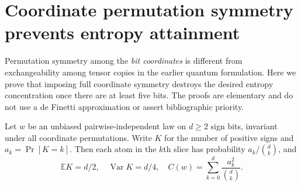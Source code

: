 \section{Coordinate permutation symmetry prevents entropy attainment}
\label{sec:coordinate-symmetry}
Permutation symmetry among the \emph{bit coordinates} is different
from exchangeability among tensor copies in the earlier quantum
formulation. Here we prove that imposing full coordinate symmetry
destroys the desired entropy concentration once there are at least
five bits. The proofs are elementary and do not use a de Finetti
approximation or assert bibliographic priority.

Let $w$ be an unbiased pairwise-independent law on $d\ge2$ sign bits,
invariant under all coordinate permutations. Write $K$ for the number
of positive signs and $a_k=\Pr[K=k]$. Then each atom in the $k$th
slice has probability $a_k/\binom dk$, and
\[
 \mathbb E K=d/2,\quad \operatorname{Var}K=d/4,\quad
 C(w)=\sum_{k=0}^d\frac{a_k^2}{\binom dk}.
\]

